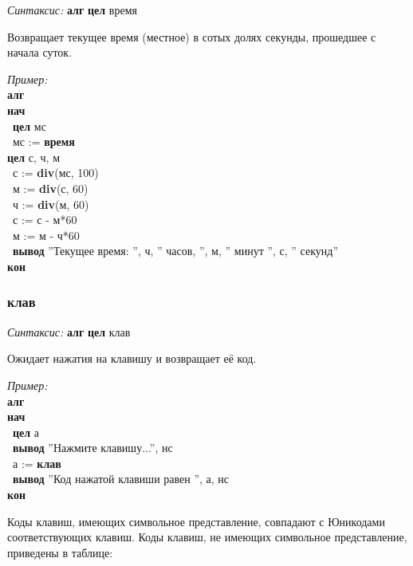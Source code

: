 \documentclass[12pt,a4paper]{article}
\newcommand{\otstup}{\textperiodcentered\ }
\begin{document}
\emph{Синтаксис:} \textbf{алг} \textbf{цел} время

Возвращает текущее время (местное) в сотых долях секунды, прошедшее с начала суток.

\emph{Пример:}
\sffamily~\\
\textbf{алг}\\
\textbf{нач}\\
\otstup \textbf{цел} мс\\
\otstup мс := \textbf{время}\\
\textbf{цел} с, ч, м\\
\otstup с := \textbf{div}(мс, 100)\\
\otstup м := \textbf{div}(с, 60)\\
\otstup ч := \textbf{div}(м, 60)\\
\otstup с := с - м*60\\
\otstup м := м - ч*60\\
\otstup \textbf{вывод} ''Текущее время: '', ч, '' часов, '', м, '' минут '', с, '' секунд''\\
\textbf{кон}\\


\normalfont
\subsubsection{клав}

\emph{Синтаксис:} \textbf{алг} \textbf{цел} клав


      
				Ожидает нажатия на клавишу и возвращает её код.
      
\emph{Пример:}      
\sffamily~\\
\textbf{алг}\\
\textbf{нач}\\
\otstup \textbf{цел} а~\\
\otstup \textbf{вывод} ''Нажмите клавишу...'', нс~\\
\otstup а  :=  \textbf{клав}~\\
\otstup \textbf{вывод} ''Код нажатой клавиши равен '', а, нс~\\
\textbf{кон}
\normalfont
      
      Коды клавиш, имеющих символьное представление, совпадают с Юникодами соответствующих клавиш.
      Коды клавиш, не имеющих символьное представление, приведены в таблице:
\end{document}

